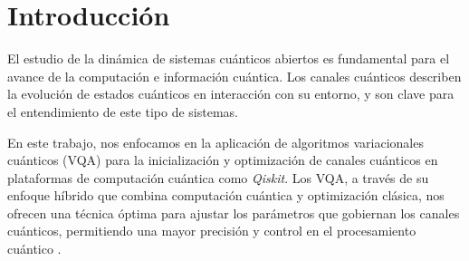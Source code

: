 \newpage
\section{Introducción}

El estudio de la dinámica de sistemas cuánticos abiertos es fundamental para el avance de la computación e información cuántica. Los canales cuánticos describen la evolución de estados cuánticos en  interacción con su entorno, y son clave para el entendimiento de este tipo de sistemas.

En este trabajo, nos enfocamos en la aplicación de algoritmos variacionales cuánticos (VQA) para la inicialización y optimización de canales cuánticos en plataformas de computación cuántica como \textit{Qiskit}\cite{Qiskit}. Los VQA, a través de su enfoque híbrido que combina computación cuántica y optimización clásica, nos ofrecen una técnica óptima para ajustar los parámetros que gobiernan los canales cuánticos, permitiendo una mayor precisión y control en el procesamiento cuántico \cite{VQA}.


